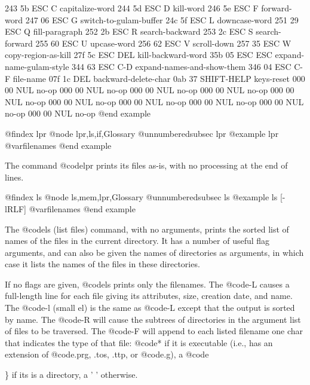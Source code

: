 {243     5b      ESC C           capitalize-word
244     5d      ESC D           kill-word
246     5e      ESC F           forward-word
247     06      ESC G           switch-to-gulam-buffer
24c     5f      ESC L           downcase-word
251     29      ESC Q           fill-paragraph
252     2b      ESC R           search-backward
253     2c      ESC S           search-forward
255     60      ESC U           upcase-word
256     62      ESC V           scroll-down
257     35      ESC W           copy-region-as-kill
27f     5c      ESC DEL         kill-backward-word
35b     05      ESC ESC         expand-name-gulam-style
344     63      ESC C-D         expand-names-and-show-them
346     04      ESC C-F         file-name
07f     1c      DEL             backward-delete-char
0ab     37      SHIFT-HELP      keys-reset
000     00      NUL             no-op
000     00      NUL             no-op
000     00      NUL             no-op
000     00      NUL             no-op
000     00      NUL             no-op
000     00      NUL             no-op
000     00      NUL             no-op
000     00      NUL             no-op
000     00      NUL             no-op
000     00      NUL             no-op
@end example

@findex lpr
@node lpr,ls,if,Glossary
@unnumberedsubsec lpr
@example
lpr @var{filenames}
@end example

The command @code{lpr} prints its files as-is, with no processing at the
end of lines.

@findex ls
@node ls,mem,lpr,Glossary
@unnumberedsubsec ls
@example
ls [-lRLF] @var{filenames} 
@end example

The @code{ls} (list files) command, with no arguments, prints the sorted
list of names of the files in the current directory.  It has a number of
useful flag arguments, and can also be given the names of directories as
arguments, in which case it lists the names of the files in these
directories.

If no flags are given, @code{ls} prints only the filenames.  The @code{-L}
causes a full-length line for each file giving its attributes, size,
creation date, and name.  The @code{-l} (small el) is the same as @code{-L}
except that the output is sorted by name.  The @code{-R} will cause the
subtrees of directories in the argument list of files to be traversed.  The
@code{-F} will append to each listed filename one char that indicates the
type of that file: @code{*} if it is executable (i.e., has an extension of
@code{.prg, .tos, .ttp}, or @code{.g}), a @code{\} if its is a directory, a
' ' otherwise.

}}
